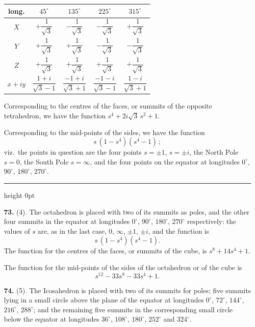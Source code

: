 \documentclass[11pt,a4paper]{article}
\newcommand{\artno}[1]{\textbf{#1.}\quad}
\begin{document}
\begin{center}
\begin{tabular}{c|cccc}
 long. & $45^{\circ}$ & $135^{\circ}$ & $225^{\circ}$ & $315^{\circ}$\\\hline
 $X$   & $+\dfrac{1}{\sqrt{3}}$ & $-\dfrac{1}{\sqrt{3}}$
       & $-\dfrac{1}{\sqrt{3}}$ & $+\dfrac{1}{\sqrt{3}}$\\[4pt]
 $Y$   & $+\dfrac{1}{\sqrt{3}}$ & $+\dfrac{1}{\sqrt{3}}$
       & $-\dfrac{1}{\sqrt{3}}$ & $-\dfrac{1}{\sqrt{3}}$\\[4pt]
 $Z$   & $+\dfrac{1}{\sqrt{3}}$ & $+\dfrac{1}{\sqrt{3}}$
       & $+\dfrac{1}{\sqrt{3}}$ & $+\dfrac{1}{\sqrt{3}}$\\[4pt]
 $x+iy$& $\dfrac{1+i}{\sqrt{3}-1}$ & $\dfrac{-1+i}{\sqrt{3}+1}$
       & $\dfrac{-1-i}{\sqrt{3}-1}$ & $\dfrac{1-i}{\sqrt{3}+1}$\\
\end{tabular}
\end{center}

\noindent
Corresponding to the centres of the faces, or summits of the opposite
tetrahedron, we have the function $s^{4} + 2i\sqrt{3}\,s^{2} + 1$.

Corresponding to the mid-points of the sides, we have the function
\[
  s\,(1 - s^{4})(s^{4} - 1)\,;
\]
viz.\ the points in question are the four points $s = \pm 1$, $s = \pm i$,
the North Pole $s = 0$, the South Pole $s = \infty$, and the four points on
the equator at longitudes $0^{\circ}$, $90^{\circ}$, $180^{\circ}$,
$270^{\circ}$.

\bigskip
\hrule height 0pt
\bigskip

\noindent
\artno{73} (4). The octahedron is placed with two of its summits as poles,
and the other four summits in the equator at longitudes $0^{\circ}$,
$90^{\circ}$, $180^{\circ}$, $270^{\circ}$ respectively: the values of $s$
are, as in the last case, $0$, $\infty$, $\pm 1$, $\pm i$, and the function
is
\[
  s\,(1 - s^{4})(s^{4} - 1).
\]
The function for the centres of the faces, or summits of the cube, is
$s^{8} + 14 s^{4} + 1$.

The function for the mid-points of the sides of the octahedron or of the
cube is
\[
  s^{12} - 33 s^{8} - 33 s^{4} + 1.
\]

\artno{74} (5). The Icosahedron is placed with two of its summits for poles;
five summits lying in a small circle above the plane of the equator at
longitudes $0^{\circ}$, $72^{\circ}$, $144^{\circ}$, $216^{\circ}$,
$288^{\circ}$; and the remaining five summits in the corresponding small
circle below the equator at longitudes $36^{\circ}$, $108^{\circ}$,
$180^{\circ}$, $252^{\circ}$ and $324^{\circ}$.
\end{document}
